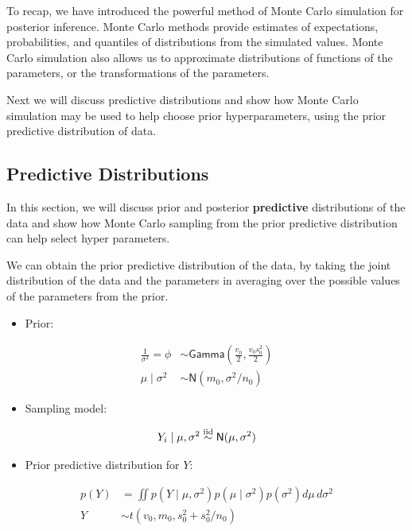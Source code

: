 \documentclass[]{book}
\providecommand{\tightlist}{%
  \setlength{\itemsep}{0pt}\setlength{\parskip}{0pt}}
\theoremstyle{definition}
\theoremstyle{definition}
\theoremstyle{definition}
\theoremstyle{remark}
\begin{document}
To recap, we have introduced the powerful method of Monte Carlo
simulation for posterior inference. Monte Carlo methods provide
estimates of expectations, probabilities, and quantiles of distributions
from the simulated values. Monte Carlo simulation also allows us to
approximate distributions of functions of the parameters, or the
transformations of the parameters.

Next we will discuss predictive distributions and show how Monte Carlo
simulation may be used to help choose prior hyperparameters, using the
prior predictive distribution of data.

\subsection{Predictive Distributions}\label{sec:NG-predictive}

In this section, we will discuss prior and posterior \textbf{predictive}
distributions of the data and show how Monte Carlo sampling from the
prior predictive distribution can help select hyper parameters.

We can obtain the prior predictive distribution of the data, by taking
the joint distribution of the data and the parameters in averaging over
the possible values of the parameters from the prior.

\begin{itemize}
\tightlist
\item
  Prior:
\end{itemize}

\[ \begin{aligned}
\frac{1}{\sigma^2} = \phi &\sim \textsf{Gamma}\left(\frac{v_0}{2}, \frac{v_0 s^2_0}{2} \right) \\
\mu \mid \sigma^2  &\sim  \textsf{N}(m_0, \sigma^2/n_0)
\end{aligned} \]

\begin{itemize}
\tightlist
\item
  Sampling model:
\end{itemize}

\[Y_i \mid \mu,\sigma^2 \mathrel{\mathop{\sim}\limits^{\rm iid}} \textsf{N}(\mu, \sigma^2) \]

\begin{itemize}
\tightlist
\item
  Prior predictive distribution for \(Y\):
\end{itemize}

\[\begin{aligned}
p(Y) &= \iint p(Y \mid \mu,\sigma^2) p(\mu \mid \sigma^2) p(\sigma^2) d\mu \, d\sigma^2 \\
Y &\sim t(v_0, m_0, s_0^2+s_0^2/n_0)
\end{aligned}\]
\end{document}
